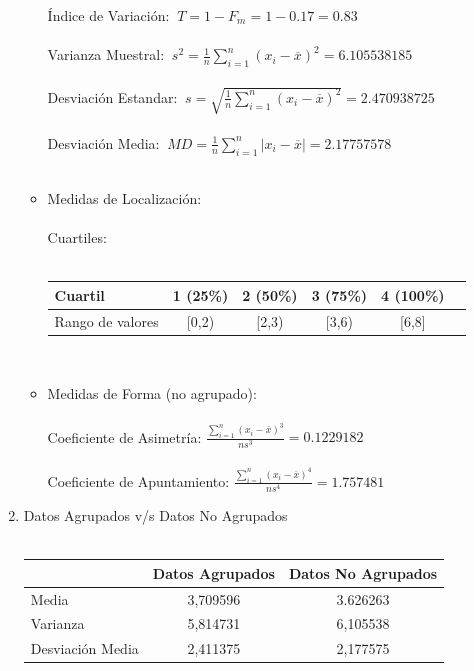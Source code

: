 \documentclass[letterpaper,spanish,11pt]{article}
\begin{document}
\begin{enumerate}
\begin{itemize}
			\'Indice de Variaci\'on: $\ T = 1 - F_m = 1 - 0.17 = 0.83 $ \\ \\
			Varianza Muestral: $\ s^2 = \frac{1}{n} \sum_{i=1} ^n (x_i - \overline{x})^2 = 6.105538185 $ \\ \\
			Desviaci\'on Estandar: $\ s = \sqrt{\frac{1}{n}\sum_{i=1} ^n (x_i - \overline{x})^2} = 2.470938725 $ \\ \\
			Desviaci\'on Media: $\ MD = \frac{1}{n} \sum_{i=1} ^n |x_i - \overline{x}| = 2.17757578 $ \\ \\

		\item Medidas de Localizaci\'on: \\ \\
			Cuartiles: \\ \\
			\begin{tabular}{|l|c|c|c|c|c|}
			\hline
			Cuartil & 1 (25\%) & 2 (50\%) & 3 (75\%) & 4 (100\%) \\
			\hline
			Rango de valores & [0,2) & [2,3) & [3,6) & [6,8] \\
			\hline
			\end{tabular} \\
		\item Medidas de Forma (no agrupado): \\ \\
			Coeficiente de Asimetr\'ia: $\frac{\sum_{i=1}^n (x_i - \overline{x})^3}{ns^3} = 0.1229182$ \\ \\
			Coeficiente de Apuntamiento: $\frac{\sum_{i=1}^n (x_i - \overline{x})^4}{ns^4}  = 1.757481$ \\
	\end{itemize}
    \item Datos Agrupados v/s Datos No Agrupados\\\\
		\begin{tabular}{|l|c|c|}
			\hline
			& Datos Agrupados & Datos No Agrupados\\
			\hline
			Media & 3,709596 & 3.626263 \\
			\hline
			Varianza & 5,814731 & 6,105538 \\
			\hline
			Desviaci\'on Media & 2,411375 & 2,177575 \\
			\hline
			\end{tabular} \\ \\

\end{enumerate}
\end{document}
